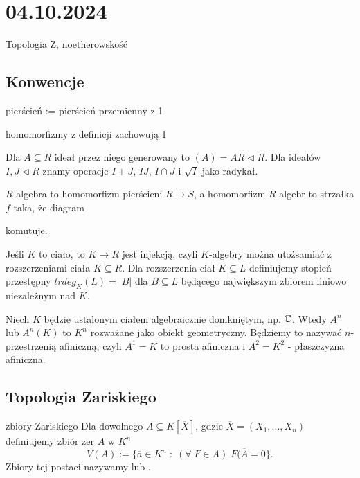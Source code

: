 \section{04.10.2024}{Topologia Z, noetherowskość}

\subsection{Konwencje}

pierścień := pierścień przemienny z 1

homomorfizmy z definicji zachowują 1

Dla $A\subseteq R$ ideał przez niego generowany to $(A)=AR\triangleleft R$. Dla ideałów $I,J\triangleleft R$ znamy operacje $I+J$, $IJ$, $I\cap J$ i $\sqrt{I}$ jako radykał.

$R$-algebra to homomorfizm pierścieni $R\to S$, a homomorfizm $R$-algebr to strzałka $f$ taka, że diagram
\begin{center}
\end{center}
komutuje.

Jeśli $K$ to ciało, to $K\to R$ jest injekcją, czyli $K$-algebry można utożsamiać z rozszerzeniami ciała $K\subseteq R$. Dla rozszerzenia ciał $K\subseteq L$ definiujemy stopień przestępny $trdeg_K(L)=|B|$ dla $B\subseteq L$ będącego największym zbiorem liniowo niezależnym nad $K$.

Niech $K$ będzie ustalonym ciałem algebraicznie domkniętym, np. $\mathbb{C}$. Wtedy $A^n$ lub $A^n(K)$ to $K^n$ rozważane jako obiekt geometryczny. Będziemy to nazywać $n$-przestrzenią afiniczną, czyli $A^1=K$ to prosta afiniczna i $A^2=K^2$ - płaszczyzna afiniczna.

\subsection{Topologia Zariskiego}

\begin{definition}{zbiory Zariskiego}{}
  Dla dowolnego $A\subseteq K[\overline{X}]$, gdzie $\overline{X}=(X_1,..., X_n)$ definiujemy zbiór zer $A$ w $K^n$
  $$V(A):=\{\overline{a}\in K^n\;:\;(\forall\;F\in A)\;F(\overline{A}=0\}.$$
  Zbiory tej postaci nazywamy  lub .
\end{definition}

